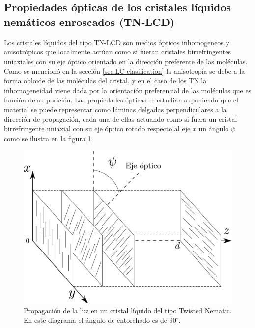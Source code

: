 \subsection{Propiedades ópticas de los cristales líquidos nemáticos enroscados (TN-LCD)}

Los cristales líquidos del tipo TN-LCD son medios ópticos inhomogeneos
y anisotrópicos que localmente actúan como si fueran cristales
birrefringentes uniaxiales con su eje óptico orientado en la dirección
preferente de las moléculas. Como se mencionó en la sección
\ref{sec:LC-clasification} la anisotropía se debe a la forma obloide
de las moléculas del cristal, y en el caso de los TN la inhomogeneidad
viene dada por la orientación preferencial de las moléculas que es
función de su posición. Las propiedades ópticas se estudian suponiendo
que el material se puede representar como láminas delgadas perpendiculares a la
dirección de propagación, cada una de ellas actuando como si fuera un
cristal birrefringente uniaxial con su eje óptico rotado respecto al eje $x$ un ángulo
$\psi$ como se ilustra en la figura
\ref{fig:tn-lcd_sticks}.  

\begin{figure}[h!]
\centering
\includegraphics[scale = .3]{TN-LCD_sticks}
\caption{Propagación de la luz en un cristal líquido del tipo Twisted
  Nematic. En este diagrama el ángulo de entorchado es de $90^{\circ}$.}
\label{fig:tn-lcd_sticks}
\end{figure}

